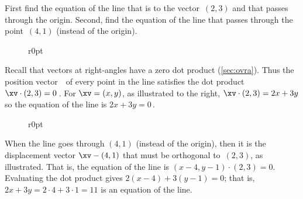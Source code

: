 \begin{example} 
First find the equation of the line that is  to the vector~\((2,3)\) and that passes through the origin.
Second, find the equation of the line that passes through the point~\((4,1)\) (instead of the origin).

\begin{wrapfigure}[5]r{0pt}
\end{wrapfigure}
\begin{solution} 
Recall that vectors at right-angles have a zero dot product (\cref{sec:ovra}).
Thus the position vector~\xv\ of every point in the line satisfies the dot product \(\xv\cdot(2,3)=0\)\,.
For \(\xv=(x,y)\), as illustrated to the right, \(\xv\cdot(2,3)=2x+3y\) so the equation of the line is \(2x+3y=0\)\,.

\vspace{1\baselineskip}
\begin{wrapfigure}r{0pt}
\end{wrapfigure}
When the line goes through \((4,1)\) (instead of the origin), then it is the displacement vector \(\xv-(4,1)\) that must be orthogonal to~\((2,3)\), as illustrated.
That is, the equation of the line is \((x-4,y-1)\cdot(2,3)=0\).
Evaluating the dot product gives \(2(x-4)+3(y-1)=0\); that is, \(2x+3y=2\cdot4+3\cdot1=11\) is an equation of the line.
\aqed\par
\end{solution}
\end{example}





